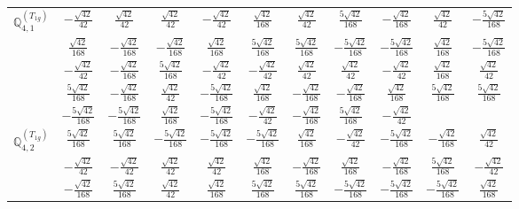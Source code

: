 \documentclass[fleqn,10pt,landscape]{article}
\begin{document}
\begin{itemize}
{\begin{center}
\begin{longtable}{ccccccccccc}
$\mathbb{Q}_{4,1}^{(T_{1g})}$ & $ - \frac{\sqrt{42}}{42} $ & $ \frac{\sqrt{42}}{42} $ & $ \frac{\sqrt{42}}{42} $ & $ - \frac{\sqrt{42}}{42} $ & $ \frac{\sqrt{42}}{168} $ & $ \frac{\sqrt{42}}{42} $ & $ \frac{5 \sqrt{42}}{168} $ & $ - \frac{\sqrt{42}}{168} $ & $ \frac{\sqrt{42}}{42} $ & $ - \frac{5 \sqrt{42}}{168} $ \\
& $ \frac{\sqrt{42}}{168} $ & $ - \frac{\sqrt{42}}{168} $ & $ - \frac{\sqrt{42}}{168} $ & $ \frac{\sqrt{42}}{168} $ & $ \frac{5 \sqrt{42}}{168} $ & $ \frac{5 \sqrt{42}}{168} $ & $ - \frac{5 \sqrt{42}}{168} $ & $ - \frac{5 \sqrt{42}}{168} $ & $ \frac{\sqrt{42}}{168} $ & $ - \frac{5 \sqrt{42}}{168} $ \\
& $ - \frac{\sqrt{42}}{42} $ & $ - \frac{\sqrt{42}}{168} $ & $ \frac{5 \sqrt{42}}{168} $ & $ - \frac{\sqrt{42}}{42} $ & $ - \frac{\sqrt{42}}{42} $ & $ \frac{\sqrt{42}}{42} $ & $ \frac{\sqrt{42}}{42} $ & $ - \frac{\sqrt{42}}{42} $ & $ \frac{\sqrt{42}}{168} $ & $ \frac{\sqrt{42}}{42} $ \\
& $ \frac{5 \sqrt{42}}{168} $ & $ - \frac{\sqrt{42}}{168} $ & $ \frac{\sqrt{42}}{42} $ & $ - \frac{5 \sqrt{42}}{168} $ & $ \frac{\sqrt{42}}{168} $ & $ - \frac{\sqrt{42}}{168} $ & $ - \frac{\sqrt{42}}{168} $ & $ \frac{\sqrt{42}}{168} $ & $ \frac{5 \sqrt{42}}{168} $ & $ \frac{5 \sqrt{42}}{168} $ \\
& $ - \frac{5 \sqrt{42}}{168} $ & $ - \frac{5 \sqrt{42}}{168} $ & $ \frac{\sqrt{42}}{168} $ & $ - \frac{5 \sqrt{42}}{168} $ & $ - \frac{\sqrt{42}}{42} $ & $ - \frac{\sqrt{42}}{168} $ & $ \frac{5 \sqrt{42}}{168} $ & $ - \frac{\sqrt{42}}{42} $ & $  $ & $  $ \\ \hline
$\mathbb{Q}_{4,2}^{(T_{1g})}$ & $ \frac{5 \sqrt{42}}{168} $ & $ \frac{5 \sqrt{42}}{168} $ & $ - \frac{5 \sqrt{42}}{168} $ & $ - \frac{5 \sqrt{42}}{168} $ & $ - \frac{5 \sqrt{42}}{168} $ & $ \frac{\sqrt{42}}{168} $ & $ - \frac{\sqrt{42}}{42} $ & $ - \frac{5 \sqrt{42}}{168} $ & $ - \frac{\sqrt{42}}{168} $ & $ \frac{\sqrt{42}}{42} $ \\
& $ - \frac{\sqrt{42}}{42} $ & $ - \frac{\sqrt{42}}{42} $ & $ \frac{\sqrt{42}}{42} $ & $ \frac{\sqrt{42}}{42} $ & $ \frac{\sqrt{42}}{168} $ & $ - \frac{\sqrt{42}}{168} $ & $ \frac{\sqrt{42}}{168} $ & $ - \frac{\sqrt{42}}{168} $ & $ \frac{5 \sqrt{42}}{168} $ & $ - \frac{\sqrt{42}}{42} $ \\
& $ - \frac{\sqrt{42}}{168} $ & $ \frac{5 \sqrt{42}}{168} $ & $ \frac{\sqrt{42}}{42} $ & $ \frac{\sqrt{42}}{168} $ & $ \frac{5 \sqrt{42}}{168} $ & $ \frac{5 \sqrt{42}}{168} $ & $ - \frac{5 \sqrt{42}}{168} $ & $ - \frac{5 \sqrt{42}}{168} $ & $ - \frac{5 \sqrt{42}}{168} $ & $ \frac{\sqrt{42}}{168} $ \\

\end{longtable}
\end{center}}
\end{itemize}
\end{document}
